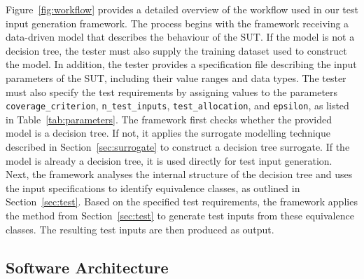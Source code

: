 \documentclass[
]{ceurart}
\theoremstyle{definition}
\begin{document}
Figure~\ref{fig:workflow} provides a detailed overview of the workflow used in our test input generation framework. The process begins with the framework receiving a data-driven model that describes the behaviour of the SUT. If the model is not a decision tree, the tester must also supply the training dataset used to construct the model. In addition, the tester provides a specification file describing the input parameters of the SUT, including their value ranges and data types. The tester must also specify the test requirements by assigning values to the parameters \lstinline{coverage_criterion}, \mbox{\lstinline{n_test_inputs},} \lstinline{test_allocation}, and \lstinline{epsilon}, as listed in Table~\ref{tab:parameters}. The framework first checks whether the provided model is a decision tree. If not, it applies the surrogate modelling technique described in Section~\ref{sec:surrogate} to construct a decision tree surrogate. If the model is already a decision tree, it is used directly for test input generation. Next, the framework analyses the internal structure of the decision tree and uses the input specifications to identify equivalence classes, as outlined in Section~\ref{sec:test}. Based on the specified test requirements, the framework applies the method from Section~\ref{sec:test} to generate test inputs from these equivalence classes. The resulting test inputs are then produced as output.

\subsection{Software Architecture}
\end{document}
